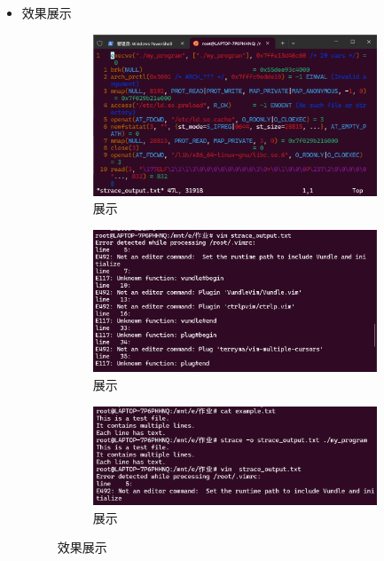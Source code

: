 \documentclass[UTF8]{ctexart}
\begin{document}
\begin{enumerate}
\begin{itemize}
\begin{verbatim}
  \end{verbatim}
\item 效果展示
\begin{figure}[H]
    \centering
    \begin{subfigure}[t]{0.32\textwidth}
        \centering
        \includegraphics[width=\textwidth]{171} %
        \caption{展示}
    \end{subfigure}%
    \hfill
    \begin{subfigure}[t]{0.32\textwidth}
        \centering
        \includegraphics[width=\textwidth]{172} %
        \caption{展示}
    \end{subfigure}%
    \hfill
    \begin{subfigure}[t]{0.32\textwidth}
        \centering
        \includegraphics[width=\textwidth]{173} %
        \caption{展示}
    \end{subfigure}
    \caption{效果展示}
\end{figure}

  \end{itemize}
\end{enumerate}
\end{document}
